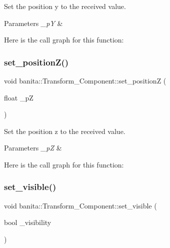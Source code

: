 Set the position y to the received value. 


\begin{DoxyParams}{Parameters}
{\em \+\_\+pY} & \\
\hline
\end{DoxyParams}
Here is the call graph for this function\+:
\mbox{\label{classbanita_1_1_transform___component_a530739c068f5fcf6ed58118761b93e03}} 
\subsubsection{\texorpdfstring{set\_positionZ()}{set\_positionZ()}}
{\footnotesize\ttfamily void banita\+::\+Transform\+\_\+\+Component\+::set\+\_\+positionZ (\begin{DoxyParamCaption}\item[{float}]{\+\_\+pZ }\end{DoxyParamCaption})\hspace{0.3cm}{\ttfamily [inline]}}



Set the position z to the received value. 


\begin{DoxyParams}{Parameters}
{\em \+\_\+pZ} & \\
\hline
\end{DoxyParams}
Here is the call graph for this function\+:
\mbox{\label{classbanita_1_1_transform___component_afef6c54fd67345ad97b1deb948a4d9e1}} 
\subsubsection{\texorpdfstring{set\_visible()}{set\_visible()}}
{\footnotesize\ttfamily void banita\+::\+Transform\+\_\+\+Component\+::set\+\_\+visible (\begin{DoxyParamCaption}\item[{bool}]{\+\_\+visibility }\end{DoxyParamCaption})\hspace{0.3cm}{\ttfamily [inline]}}



